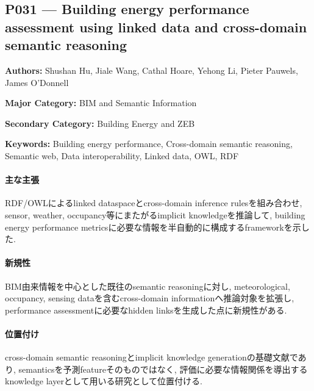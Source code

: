 \subsection{P031 --- Building energy performance assessment using linked data and cross-domain semantic reasoning}
\label{paper:P031}
\textbf{Authors:} Shushan Hu, Jiale Wang, Cathal Hoare, Yehong Li, Pieter Pauwels, James O'Donnell\par
\textbf{Major Category:} BIM and Semantic Information\par
\textbf{Secondary Category:} Building Energy and ZEB\par
\textbf{Keywords:} Building energy performance, Cross-domain semantic reasoning, Semantic web, Data interoperability, Linked data, OWL, RDF\par
\paragraph{主な主張}
RDF/OWLによるlinked dataspaceとcross-domain inference rulesを組み合わせ, sensor, weather, occupancy等にまたがるimplicit knowledgeを推論して, building energy performance metricsに必要な情報を半自動的に構成するframeworkを示した. \cite{Hu:2021CrossDomainSemanticReasoning}
\paragraph{新規性}
BIM由来情報を中心とした既往のsemantic reasoningに対し, meteorological, occupancy, sensing dataを含むcross-domain informationへ推論対象を拡張し, performance assessmentに必要なhidden linksを生成した点に新規性がある.
\paragraph{位置付け}
cross-domain semantic reasoningとimplicit knowledge generationの基礎文献であり, semanticsを予測featureそのものではなく, 評価に必要な情報関係を導出するknowledge layerとして用いる研究として位置付ける.
